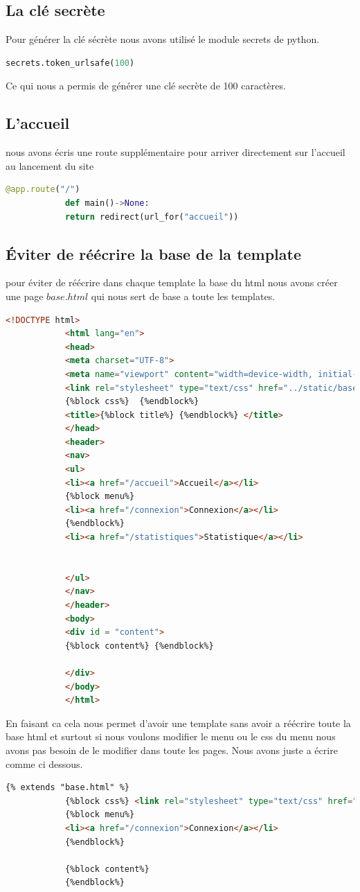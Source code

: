 	\subsection{La clé secrète}
		Pour générer la clé sécrète nous avons utilisé le module secrets de python.
		\begin{lstlisting}[language=python]
			secrets.token_urlsafe(100)
		\end{lstlisting}
		Ce qui nous a permis de générer une clé secrète de 100 caractères. 
	\subsection{L'accueil}	
		nous avons écris une route supplémentaire pour arriver directement sur l'accueil au lancement du site
		\begin{lstlisting}[language=python]
			@app.route("/")
			def main()->None:
			return redirect(url_for("accueil"))
		\end{lstlisting}
	
	\subsection{Éviter de réécrire la base de la template}
		pour éviter de réécrire dans chaque template la base du html nous avons créer une page $base.html$ qui nous sert de base a toute les templates. 
		\begin{lstlisting}[language=html]
			<!DOCTYPE html>
			<html lang="en">
			<head>
			<meta charset="UTF-8">
			<meta name="viewport" content="width=device-width, initial-scale=1.0">
			<link rel="stylesheet" type="text/css" href="../static/base.css">
			{%block css%}  {%endblock%}
			<title>{%block title%} {%endblock%} </title>
			</head>
			<header>
			<nav>
			<ul>
			<li><a href="/accueil">Accueil</a></li>
			{%block menu%}
			<li><a href="/connexion">Connexion</a></li>
			{%endblock%}
			<li><a href="/statistiques">Statistique</a></li>
			
			
			</ul>  
			</nav>
			</header>
			<body>
			<div id = "content">
			{%block content%} {%endblock%}
			
			</div>
			</body>
			</html>
		\end{lstlisting}
		
		En faisant ca cela nous permet d'avoir une template sans avoir a réécrire toute la base html et surtout si nous voulons modifier le menu ou le css du menu nous avons pas besoin de le modifier dans toute les pages. Nous avons juste a écrire comme ci dessous. 
		\pagebreak
		\begin{lstlisting}[language=html]
			{% extends "base.html" %}
			{%block css%} <link rel="stylesheet" type="text/css" href="../static/connexion.css"> {%endblock%}
			{%block menu%}            
			<li><a href="/connexion">Connexion</a></li>
			{%endblock%}
			
			{%block content%}
			{%endblock%}
		\end{lstlisting} 
		
